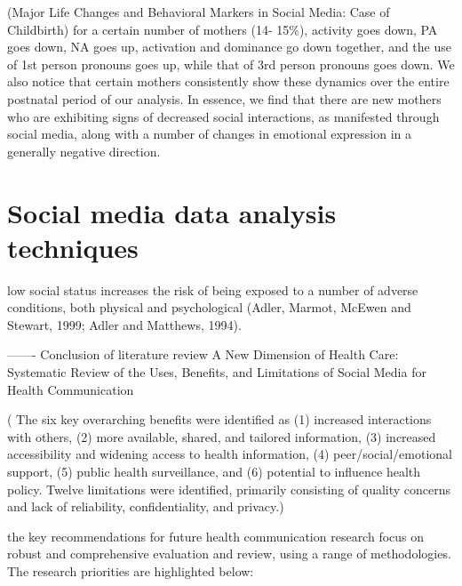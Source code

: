 (Major Life Changes and Behavioral Markers in Social
Media: Case of Childbirth)
for a certain number of mothers (14-
15\%), activity goes down, PA goes down, NA goes up,
activation and dominance go down together, and the use of
1st person pronouns goes up, while that of 3rd person
pronouns goes down. We also notice that certain mothers
consistently show these dynamics over the entire postnatal
period of our analysis. In essence, we find that there are
new mothers who are exhibiting signs of decreased social
interactions, as manifested through social media, along with
a number of changes in emotional expression in a generally
negative direction.

\section{Social media data analysis techniques}

low social status increases the risk of being exposed to a number of adverse conditions, both physical and psychological (Adler, Marmot, McEwen and Stewart, 1999; Adler and Matthews, 1994). 


-------
Conclusion of literature review 
A New Dimension of Health Care: Systematic Review of the Uses, Benefits, and Limitations of Social Media for Health Communication

( The six key overarching benefits were identified as (1) increased interactions with others, (2) more available, shared, and tailored information, (3) increased accessibility and widening access to health information, (4) peer/social/emotional support, (5) public health surveillance, and (6) potential to influence health policy. Twelve limitations were identified, primarily consisting of quality concerns and lack of reliability, confidentiality, and privacy.)


 the key recommendations for future health communication research focus on robust and comprehensive evaluation and review, using a range of methodologies. The research priorities are highlighted below:

